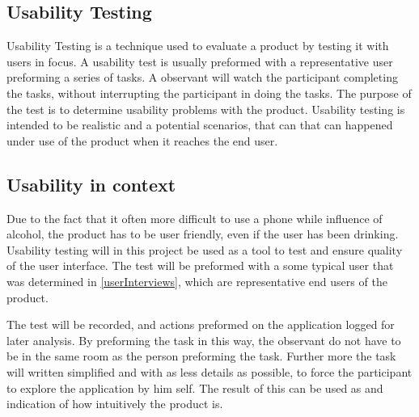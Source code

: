 \subsection{Usability Testing}
\label{sub:usability_testing}

Usability Testing is a technique used to evaluate a product by testing it with users in focus. A usability test is usually preformed with a representative user preforming a series of tasks. A observant will watch the participant completing the tasks, without interrupting the participant in doing the tasks. The purpose of the test is to determine usability problems with the product. 
Usability testing is intended to be realistic and a potential scenarios, that can that can happened under use of the product when it reaches the end user. 

\subsection{Usability in context}
\label{sub:usability_in_context}

Due to the fact that it often more difficult to use a phone while influence of alcohol, the product has to be user friendly, even if the user has been drinking.  
Usability testing will in this project be used as a tool to test and ensure quality of the user interface. The test will be preformed with a some typical user that was determined in \cref{userInterviews}, which are representative end users of the product. 


The test will be recorded, and actions preformed on the application logged for later analysis. By preforming the task in this way, the observant do not have to be in the same room as the person preforming the task. Further more the task will written simplified and with as less details as possible, to force the participant to explore the application by him self. The result of this can be used as and indication of how intuitively the product is.


